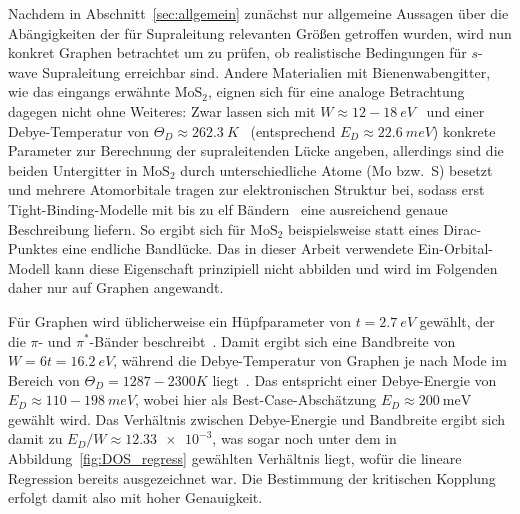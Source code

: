 Nachdem in Abschnitt~\ref{sec:allgemein} zunächst nur allgemeine Aussagen über die Abängigkeiten der für Supraleitung relevanten Größen getroffen wurden, wird nun konkret Graphen betrachtet um zu prüfen, ob realistische Bedingungen für $s$-wave Supraleitung erreichbar sind.
Andere Materialien mit Bienenwabengitter, wie das eingangs erwähnte $\mathrm{MoS_2}$, eignen sich für eine analoge Betrachtung dagegen nicht ohne Weiteres:
Zwar lassen sich mit $W \approx 12 - \qty{18}{eV}$~\cite{shahriari_band_2018} und einer Debye-Temperatur von $\Theta_D \approx \qty{262.3}{K}$~\cite{peng_thermal_2016} (entsprechend $E_D \approx \qty{22.6}{meV}$) konkrete Parameter zur Berechnung der supraleitenden Lücke angeben, allerdings sind die beiden Untergitter in $\mathrm{MoS_2}$ durch unterschiedliche Atome (Mo bzw.\ S) besetzt und mehrere Atomorbitale tragen zur elektronischen Struktur bei, sodass erst Tight-Binding-Modelle mit bis zu elf Bändern~\cite{jalilvand_multi-band_2020, shahriari_band_2018} eine ausreichend genaue Beschreibung liefern.
So ergibt sich für $\mathrm{MoS_2}$ beispielsweise statt eines Dirac-Punktes eine endliche Bandlücke.
Das in dieser Arbeit verwendete Ein-Orbital-Modell kann diese Eigenschaft prinzipiell nicht abbilden und wird im Folgenden daher nur auf Graphen angewandt.

Für Graphen wird üblicherweise ein Hüpfparameter von $t=\qty{2.7}{eV}$ gewählt, der die $\pi$- und $\pi^*$-Bänder beschreibt~\cite{castro_neto_electronic_2009, kundu_tight_2009,peres_colloquium_2010}.
Damit ergibt sich eine Bandbreite von $W = 6 t = \qty{16.2}{eV}$, während die Debye-Temperatur von Graphen je nach Mode im Bereich von $\Theta_D = \num{1287} - \qty{2300}K$ liegt~\cite{tewary_singular_2009}.
Das entspricht einer Debye-Energie von $E_D \approx \num{110} - \qty{198}{meV}$, wobei hier als Best-Case-Abschätzung $E_D \approx \qty{200}{\milli\electronvolt}$ gewählt wird.
Das Verhältnis zwischen Debye-Energie und Bandbreite ergibt sich damit zu $E_D/W \approx \num{12.33e-3}$, was sogar noch unter dem in Abbildung~\ref{fig:DOS_regress} gewählten Verhältnis liegt, wofür die lineare Regression bereits ausgezeichnet war. 
Die Bestimmung der kritischen Kopplung erfolgt damit also mit hoher Genauigkeit.

